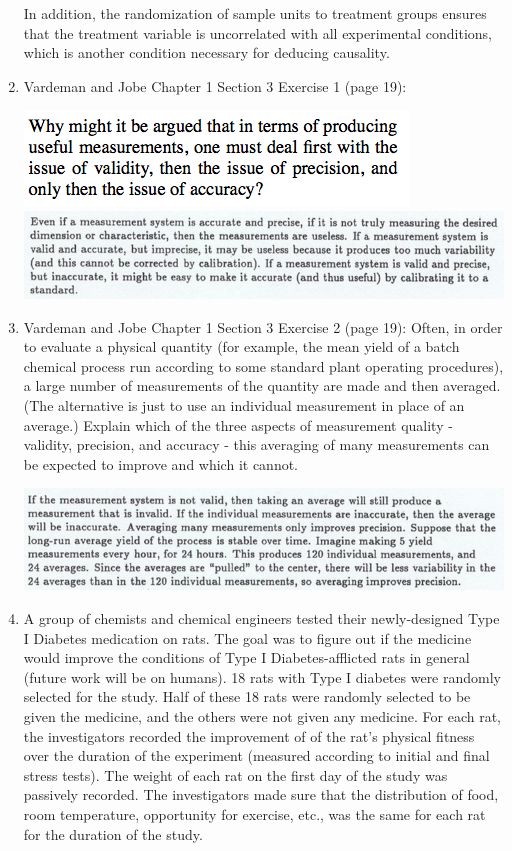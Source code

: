 \documentclass{article}\usepackage{graphicx, color}
\numberwithin{equation}{section}
\begin{document}
\begin{flushleft}
\begin{enumerate}[1. ]
In addition, the randomization of sample units to treatment groups ensures that the treatment variable is uncorrelated with all experimental conditions, which is another condition necessary for deducing causality.

\item Vardeman and Jobe Chapter 1 Section 3 Exercise 1 (page 19):

 \includegraphics{../../fig/ch1s3p1.png}
 \includegraphics{../../fig/ch1s3p1sol.png} 

\item Vardeman and Jobe Chapter 1 Section 3 Exercise 2 (page 19): Often, in order to evaluate a physical quantity (for example, the mean yield of a batch chemical process run according to some standard plant operating procedures), a large number of measurements of the quantity are made and then averaged. (The alternative is just to use an individual measurement in place of an average.) Explain which of the three aspects of measurement quality - validity, precision, and accuracy - this averaging of many measurements can be expected to improve and which it cannot.

 \includegraphics{../../fig/ch1s3p2sol.png}

\item  A group of chemists and chemical engineers tested their newly-designed Type I Diabetes medication on rats. The goal was to figure out if the medicine would improve the conditions of Type I Diabetes-afflicted rats in general (future work will be on humans). 18 rats with Type I diabetes were randomly selected for the study. Half of these 18 rats were randomly selected to be given the medicine, and the others were not given any medicine. For each rat, the investigators recorded the improvement of of the rat's physical fitness over the duration of the experiment (measured according to initial and final stress tests). The weight of each rat on the first day of the study was passively recorded. The investigators made sure that the distribution of food, room temperature, opportunity for exercise, etc., was the same for each rat for the duration of the study.


\end{enumerate}
\end{flushleft}
\end{document}
